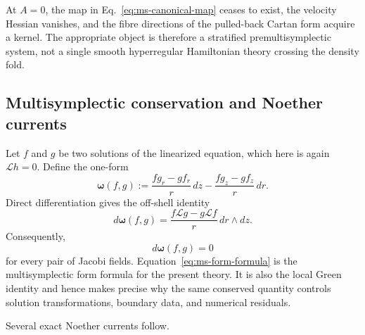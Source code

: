 At $A=0$, the map in Eq.~\eqref{eq:ms-canonical-map} ceases to exist, the
velocity Hessian vanishes, and the fibre directions of the pulled-back
Cartan form acquire a kernel. The appropriate object is therefore a
stratified premultisymplectic system, not a single smooth hyperregular
Hamiltonian theory crossing the density fold.

\subsection{Multisymplectic conservation and Noether currents}

Let $f$ and $g$ be two solutions of the linearized equation, which here is
again $\mathcal Lh=0$. Define the one-form
\begin{equation}
\boldsymbol\omega(f,g)
:=\frac{f g_r-g f_r}{r}\,dz
-\frac{f g_z-g f_z}{r}\,dr.
\label{eq:ms-current-form}
\end{equation}
Direct differentiation gives the off-shell identity
\begin{equation}
d\boldsymbol\omega(f,g)
=\frac{f\mathcal Lg-g\mathcal Lf}{r}\,dr\wedge dz.
\label{eq:ms-form-formula-offshell}
\end{equation}
Consequently,
\begin{equation}
d\boldsymbol\omega(f,g)=0
\label{eq:ms-form-formula}
\end{equation}
for every pair of Jacobi fields. Equation~\eqref{eq:ms-form-formula} is the
multisymplectic form formula for the present theory. It is also the local
Green identity and hence makes precise why the same conserved quantity
controls solution transformations, boundary data, and numerical residuals.

Several exact Noether currents follow.


